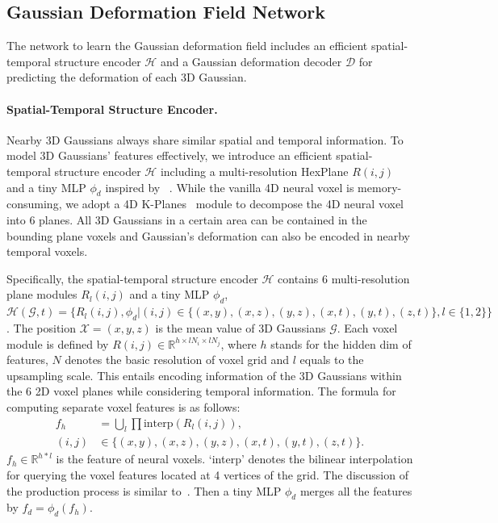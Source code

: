 \subsection{Gaussian Deformation Field Network}
\label{subsec:filed}

The network to learn the Gaussian deformation field includes an efficient spatial-temporal structure encoder $\mathcal{H}$ and a Gaussian deformation decoder $\mathcal{D}$ for predicting the deformation of each 3D Gaussian.

\paragraph{Spatial-Temporal Structure Encoder.}

Nearby 3D Gaussians always share similar spatial and temporal information. To model 3D Gaussians' features effectively, we introduce an efficient spatial-temporal structure encoder $\mathcal{H}$ including a multi-resolution HexPlane $R(i,j)$ and a tiny MLP $\phi_d$ inspired by ~\cite{tineuvox,hexplane,kplanes,tensor4d}. While the vanilla 4D neural voxel is memory-consuming, we adopt a 4D K-Planes~\cite{kplanes} module to decompose the 4D neural voxel into 6 planes. All 3D Gaussians in a certain area can be contained in the bounding plane voxels and Gaussian's deformation can also be encoded in nearby temporal voxels.

Specifically, the spatial-temporal structure encoder $\mathcal{H}$ contains 6 multi-resolution plane modules $R_l(i,j)$ and a tiny MLP $\phi_d$, \ie $\mathcal{H}(\mathcal{G},t)=\{R_l(i,j), \phi_d | (i,j) \in \{(x,y),(x,z),(y,z),(x,t),(y,t),(z,t)\}, l \in \{1,2\}\}$. The position $\mathcal{X} = (x,y,z)$ is the mean value of 3D Gaussians $\mathcal{G}$. Each voxel module is defined by $R(i,j)\in \mathbb{R}^{h\times l N_i \times l N_j}$, where $h$ stands for the hidden dim of features, $N$ denotes the basic resolution of voxel grid and $l$ equals to the upsampling scale. 
This entails encoding information of the 3D Gaussians within the 6 2D voxel planes while considering temporal information. The formula for computing separate voxel features is as follows:
\begin{equation}
\begin{aligned}
  f_h &= \bigcup_l \prod \text{interp}(R_l(i,j)), \\
    (i,j) &\in \{(x,y),(x,z),(y,z),(x,t),(y,t),(z,t)\}. 
\end{aligned}
\label{formula:feature_position}
\end{equation}
$f_{h} \in \mathbb{R}^{h*l}$ is the feature of neural voxels. `interp' denotes the bilinear interpolation for querying the voxel features located at 4 vertices of the grid. The discussion of the production process is similar to~\cite{kplanes}. Then a tiny MLP $\phi_d$ merges all the features by $f_d = \phi_d(f_h)$.

